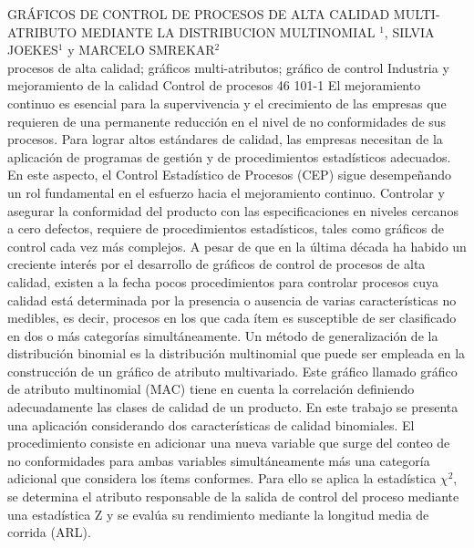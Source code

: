 \A
{GRÁFICOS DE CONTROL DE PROCESOS DE ALTA CALIDAD MULTI-ATRIBUTO MEDIANTE LA DISTRIBUCION MULTINOMIAL}
{$^1$, SILVIA JOEKES$^1$ y MARCELO SMREKAR$^2$}
{
\\}
{procesos de alta calidad; gráficos multi-atributos; gráfico de  control} 
 {Industria y mejoramiento de la calidad} 
 {Control de procesos} 
 {46} 
 {101-1}
{El mejoramiento continuo es esencial para la supervivencia y el crecimiento de las empresas que requieren de una permanente reducción en el nivel de no conformidades de sus procesos. Para lograr altos estándares de calidad, las empresas necesitan de la aplicación de programas de gestión y de procedimientos estadísticos adecuados. En este aspecto, el Control Estadístico de Procesos (CEP) sigue desempeñando un rol fundamental en el esfuerzo hacia el mejoramiento continuo. Controlar y asegurar la conformidad del producto con las especificaciones en niveles cercanos a cero defectos, requiere de procedimientos estadísticos, tales como gráficos de control cada vez más complejos. A pesar de que en la última década ha habido un creciente interés por el desarrollo de gráficos de control de procesos de alta calidad, existen a la fecha pocos procedimientos para controlar procesos cuya calidad está determinada por la presencia o ausencia de varias características no medibles, es decir, procesos en los que cada ítem es susceptible de ser clasificado en dos o más categorías simultáneamente. Un método de generalización de la distribución binomial es la distribución multinomial que puede ser empleada en la construcción de un gráfico de atributo multivariado. Este gráfico llamado gráfico de atributo multinomial (MAC) tiene en cuenta la correlación definiendo adecuadamente las clases de calidad de un producto. En este trabajo se presenta una aplicación considerando dos características de calidad binomiales. El procedimiento consiste en adicionar una nueva variable que surge del conteo de no conformidades para ambas variables simultáneamente más una categoría adicional que considera los ítems conformes. Para ello se aplica la estadística $\chi^2$, se determina el atributo responsable de la salida de control del proceso mediante una estadística Z y se evalúa su rendimiento mediante la longitud media de corrida (ARL).}
